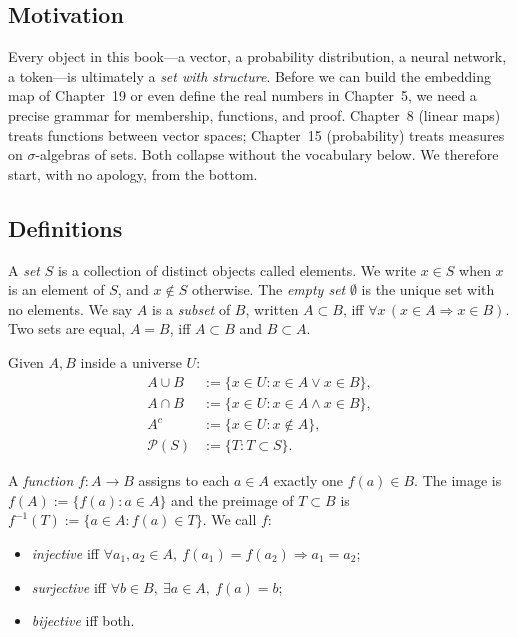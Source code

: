 \subsection*{Motivation}

Every object in this book---a vector, a probability distribution, a neural network, a token---is ultimately a \emph{set with structure}. Before we can build the embedding map of Chapter~19 or even define the real numbers in Chapter~5, we need a precise grammar for membership, functions, and proof. Chapter~8 (linear maps) treats functions between vector spaces; Chapter~15 (probability) treats measures on $\sigma$-algebras of sets. Both collapse without the vocabulary below. We therefore start, with no apology, from the bottom.

\subsection*{Definitions}

\begin{definition}
A \emph{set} $S$ is a collection of distinct objects called elements. We write $x \in S$ when $x$ is an element of $S$, and $x \notin S$ otherwise. The \emph{empty set} $\emptyset$ is the unique set with no elements. We say $A$ is a \emph{subset} of $B$, written $A \subset B$, iff $\forall x\,(x \in A \Rightarrow x \in B)$. Two sets are equal, $A = B$, iff $A \subset B$ and $B \subset A$.
\end{definition}

\begin{definition}
Given $A, B$ inside a universe $U$:
\begin{align*}
A \cup B &:= \{x \in U : x \in A \lor x \in B\}, \\
A \cap B &:= \{x \in U : x \in A \land x \in B\}, \\
A^{c}    &:= \{x \in U : x \notin A\}, \\
\mathcal{P}(S) &:= \{T : T \subset S\}.
\end{align*}
\end{definition}

\begin{definition}
A \emph{function} $f : A \to B$ assigns to each $a \in A$ exactly one $f(a) \in B$. The image is $f(A) := \{f(a) : a \in A\}$ and the preimage of $T \subset B$ is $f^{-1}(T) := \{a \in A : f(a) \in T\}$. We call $f$:
\begin{itemize}
  \item \emph{injective} iff $\forall a_1, a_2 \in A,\ f(a_1) = f(a_2) \Rightarrow a_1 = a_2$;
  \item \emph{surjective} iff $\forall b \in B,\ \exists a \in A,\ f(a) = b$;
  \item \emph{bijective} iff both.
\end{itemize}
\end{definition}

